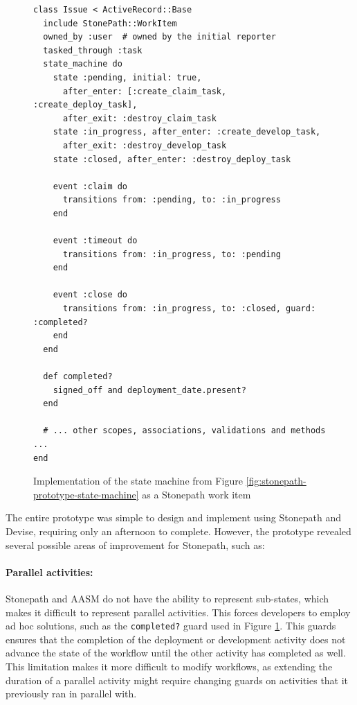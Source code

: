 \documentclass[document.tex]{subfiles}
\begin{document}
\begin{figure}[!ht]
  \begin{lstlisting}
class Issue < ActiveRecord::Base
  include StonePath::WorkItem
  owned_by :user  # owned by the initial reporter
  tasked_through :task
  state_machine do
    state :pending, initial: true,
      after_enter: [:create_claim_task, :create_deploy_task],
      after_exit: :destroy_claim_task
    state :in_progress, after_enter: :create_develop_task,
      after_exit: :destroy_develop_task
    state :closed, after_enter: :destroy_deploy_task

    event :claim do
      transitions from: :pending, to: :in_progress
    end

    event :timeout do
      transitions from: :in_progress, to: :pending
    end

    event :close do
      transitions from: :in_progress, to: :closed, guard: :completed?
    end
  end

  def completed?
    signed_off and deployment_date.present?
  end

  # ... other scopes, associations, validations and methods ...
end
  \end{lstlisting}
  \caption{Implementation of the state machine from Figure \ref{fig:stonepath-prototype-state-machine} as a Stonepath work item}
  \label{fig:stonepath-prototype-workitem}
\end{figure}

The entire prototype was simple to design and implement using Stonepath and Devise, requiring only an afternoon to complete. However, the prototype revealed several possible areas of improvement for Stonepath, such as:

\paragraph{Parallel activities:} Stonepath and AASM do not have the ability to represent sub-states, which makes it difficult to represent parallel activities. This forces developers to employ ad hoc solutions, such as the \verb!completed?! guard used in Figure \ref{fig:stonepath-prototype-workitem}. This guards ensures that the completion of the deployment or development activity does not advance the state of the workflow until the other activity has completed as well. This limitation makes it more difficult to modify workflows, as extending the duration of a parallel activity might require changing guards on activities that it previously ran in parallel with.
\end{document}
